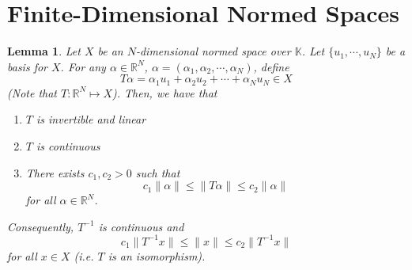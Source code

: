 \documentclass[12pt]{article}
\newtheorem{lemma}{Lemma}
\newcommand{\R}{{\mathbb R}}
\def\K{\mathbb{K}}
\begin{document}
\section*{Finite-Dimensional Normed Spaces}
\setcounter{equation}{0}
\begin{lemma}
Let $X$ be an $N$-dimensional normed space over $\K$. Let $\{ u_1, \cdots, u_N\}$ be a basis for $X$. For any $\alpha \in \R^N$, $\alpha = (\alpha_1, \alpha_2, \cdots, \alpha_N)$, define 
\[ T\alpha = \alpha_1 u_1 + \alpha_2 u_2 + \cdots + \alpha_N u_N \in X  \]
(Note that $T: \R^N \mapsto X$). Then, we have that 
\begin{enumerate}[topsep=-15pt, itemsep=0pt]
\item $T$ is invertible and linear
\item $T$ is continuous
\item There exists $c_1, c_2 > 0$ such that 
\begin{equation}
c_1 \| \alpha \| \leq \| T \alpha \| \leq c_2 \| \alpha \|
\end{equation} 
for all $\alpha \in \R^N$.
\end{enumerate}
Consequently, $T^{-1}$ is continuous and 
\begin{equation}
c_1 \| T^{-1}x \| \leq \| x \| \leq c_2 \| T^{-1}x \| 
\end{equation}
for all $x \in X$ (i.e. $T$ is an isomorphism).
\end{lemma}
\vspace{-20pt}
\end{document}
